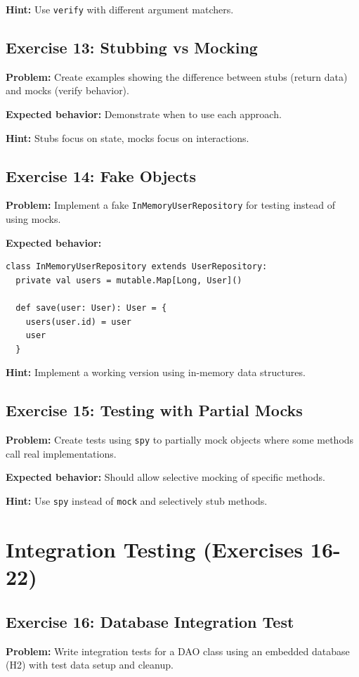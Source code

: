 \documentclass[12pt,a4paper]{article}
\begin{document}
\textbf{Hint:} Use \texttt{verify} with different argument matchers.

\subsection{Exercise 13: Stubbing vs Mocking}
\textbf{Problem:} Create examples showing the difference between stubs (return data) and mocks (verify behavior).

\textbf{Expected behavior:} Demonstrate when to use each approach.

\textbf{Hint:} Stubs focus on state, mocks focus on interactions.

\subsection{Exercise 14: Fake Objects}
\textbf{Problem:} Implement a fake \texttt{InMemoryUserRepository} for testing instead of using mocks.

\textbf{Expected behavior:}
\begin{lstlisting}
class InMemoryUserRepository extends UserRepository:
  private val users = mutable.Map[Long, User]()
  
  def save(user: User): User = {
    users(user.id) = user
    user
  }
\end{lstlisting}

\textbf{Hint:} Implement a working version using in-memory data structures.

\subsection{Exercise 15: Testing with Partial Mocks}
\textbf{Problem:} Create tests using \texttt{spy} to partially mock objects where some methods call real implementations.

\textbf{Expected behavior:} Should allow selective mocking of specific methods.

\textbf{Hint:} Use \texttt{spy} instead of \texttt{mock} and selectively stub methods.

\section{Integration Testing (Exercises 16-22)}

\subsection{Exercise 16: Database Integration Test}
\textbf{Problem:} Write integration tests for a DAO class using an embedded database (H2) with test data setup and cleanup.
\end{document}
